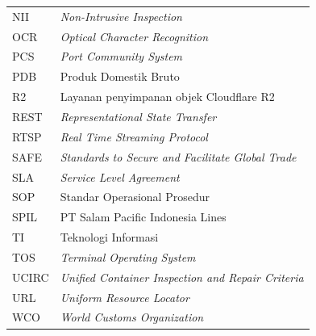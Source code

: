 \begin{longtable}{@{} l >{\raggedright\arraybackslash}p{11cm} @{}}
NII & \textit{Non-Intrusive Inspection} \\
OCR & \textit{Optical Character Recognition} \\
PCS & \textit{Port Community System} \\
PDB & Produk Domestik Bruto \\
R2 & Layanan penyimpanan objek Cloudflare R2 \\
REST & \textit{Representational State Transfer} \\
RTSP & \textit{Real Time Streaming Protocol} \\
SAFE & \textit{Standards to Secure and Facilitate Global Trade} \\
SLA & \textit{Service Level Agreement} \\
SOP & Standar Operasional Prosedur \\
SPIL & PT Salam Pacific Indonesia Lines \\
TI & Teknologi Informasi \\
TOS & \textit{Terminal Operating System} \\
UCIRC & \textit{Unified Container Inspection and Repair Criteria} \\
URL & \textit{Uniform Resource Locator} \\
WCO & \textit{World Customs Organization} \\
\end{longtable}
\endgroup
